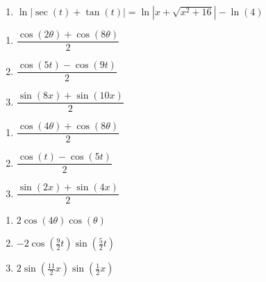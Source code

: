 \begin{enumerate}

\setcounter{enumi}{\value{HW}}
\item $\ln|\sec(t) + \tan(t)| = \ln |x + \sqrt{x^{2} + 16}| - \ln(4)$ 

\setcounter{HW}{\value{enumi}}

\end{enumerate}

\begin{multicols}{3}

\begin{enumerate}

\setcounter{enumi}{\value{HW}}

\addtocounter{enumi}{11}

\item $\dfrac{\cos(2\theta) + \cos(8\theta)}{2}$
\item $\dfrac{\cos(5t) - \cos(9t)}{2}$
\item $\dfrac{\sin(8x) + \sin(10x)}{2}$

\setcounter{HW}{\value{enumi}}

\end{enumerate}

\end{multicols}

\begin{multicols}{3}

\begin{enumerate}

\setcounter{enumi}{\value{HW}}

\item $\dfrac{\cos(4\theta) + \cos(8\theta)}{2}$
\item  $\dfrac{\cos(t) - \cos(5t)}{2}$
\item  $\dfrac{\sin(2x) + \sin(4x)}{2}$

\setcounter{HW}{\value{enumi}}

\end{enumerate}

\end{multicols}

\begin{multicols}{3}

\begin{enumerate}

\setcounter{enumi}{\value{HW}}

\item $2\cos(4\theta)\cos(\theta)$
\item $-2\cos \left( \frac{9}{2}t \right) \sin \left( \frac{5}{2}t \right)$
\item $2\sin \left( \frac{11}{2}x \right) \sin \left( \frac{1}{2}x \right)$

\setcounter{HW}{\value{enumi}}

\end{enumerate}

\end{multicols}

